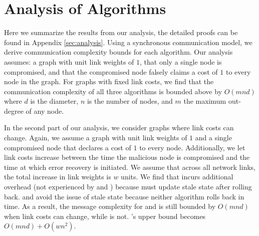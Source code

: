 
\section{Analysis of Algorithms}
\label{sec:analysis-summary}

Here we summarize the results from our analysis, the detailed proofs can be found in Appendix \ref{sec:analysis}.
Using a synchronous communication model, we derive communication complexity bounds for each algorithm.  Our analysis assumes: a graph with unit link weights of $1$,
that only a single node is compromised, and that the compromised node
falsely claims a cost of $1$ to every node in the graph. 
For graphs with fixed link costs, we find that the communication complexity of all three algorithms is bounded above by $O(mnd)$  where $d$ is the diameter, $n$ is the number of nodes, and $m$ the maximum out-degree of any node.

In the second part of our analysis, we consider graphs where link costs can change. Again, we assume a graph with unit link weights of $1$ and a single compromised node that declares a cost of $1$ to every node.
Additionally, we let link costs increase between the time the malicious node is compromised and the time at which error recovery is initiated.  
We assume that across all network links, the total increase in link weights is $w$ units.
We find that \cpr incurs additional overhead (not experienced by \second and \purges) because \cpr must update stale state after rolling back. 
\second and \purge avoid the issue of stale state because neither algorithm rolls back in time.  As a result, the message complexity for \second and \purge is still bounded by
$O(mnd)$ when link costs can change, while \cpr is not. \cprs's upper bound becomes $O(mnd) + O(wn^2)$. 



